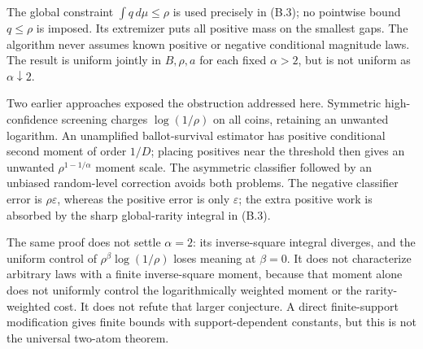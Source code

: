 The global constraint $\int q\,d\mu\le\rho$ is used precisely in (B.3); no
pointwise bound $q\le\rho$ is imposed. Its extremizer puts all positive mass
on the smallest gaps. The algorithm never assumes known positive or negative
conditional magnitude laws. The result is uniform jointly in $B,\rho,a$ for
each fixed $\alpha>2$, but is not uniform as $\alpha\downarrow2$.

Two earlier approaches exposed the obstruction addressed here. Symmetric
high-confidence screening charges $\log(1/\rho)$ on all coins, retaining an
unwanted logarithm. An unamplified ballot-survival estimator has positive
conditional second moment of order $1/D$; placing positives near the threshold
then gives an unwanted $\rho^{1-1/\alpha}$ moment scale. The asymmetric
classifier followed by an unbiased random-level correction avoids both
problems. The negative classifier error is $\rho\varepsilon$, whereas the
positive error is only $\varepsilon$; the extra positive work is absorbed by
the sharp global-rarity integral in (B.3).

The same proof does not settle $\alpha=2$: its inverse-square integral diverges,
and the uniform control of $\rho^\beta\log(1/\rho)$ loses meaning at $\beta=0$.
It does not characterize arbitrary laws with a finite inverse-square moment,
because that moment alone does not uniformly control the logarithmically
weighted moment or the rarity-weighted cost. It does not refute that larger
conjecture. A direct finite-support modification gives finite bounds with
support-dependent constants, but this is not the universal two-atom theorem.
